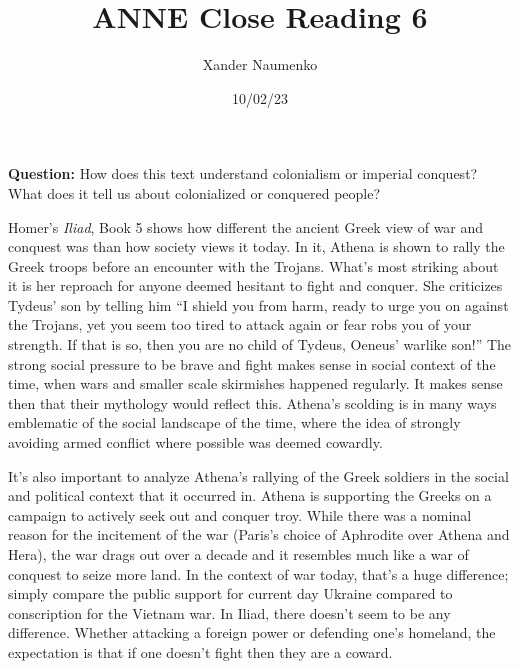 \documentclass[letterpaper, reqno,11pt]{article}
\begin{document}
\title{ANNE Close Reading 6}
\date{10/02/23}
\author{Xander Naumenko}
\maketitle

{\bf Question:} How does this text understand colonialism or imperial conquest? What does it tell us about colonialized or conquered people? 

Homer's {\em Iliad}, Book 5 shows how different the ancient Greek view of war and conquest was than how society views it today. In it, Athena is shown to rally the Greek troops before an encounter with the Trojans. What's most striking about it is her reproach for anyone deemed hesitant to fight and conquer. She criticizes Tydeus' son by telling him ``I shield you from harm, ready to urge you on against the Trojans, yet you seem too tired to attack again or fear robs you of your strength. If that is so, then you are no child of Tydeus, Oeneus' warlike son!'' The strong social pressure to be brave and fight makes sense in social context of the time, when wars and smaller scale skirmishes happened regularly. It makes sense then that their mythology would reflect this. Athena's scolding is in many ways emblematic of the social landscape of the time, where the idea of strongly avoiding armed conflict where possible was deemed cowardly. 

It's also important to analyze Athena's rallying of the Greek soldiers in the social and political context that it occurred in. Athena is supporting the Greeks on a campaign to actively seek out and conquer troy. While there was a nominal reason for the incitement of the war (Paris's choice of Aphrodite over Athena and Hera), the war drags out over a decade and it resembles much like a war of conquest to seize more land. In the context of war today, that's a huge difference; simply compare the public support for current day Ukraine compared to conscription for the Vietnam war. In Iliad, there doesn't seem to be any difference. Whether attacking a foreign power or defending one's homeland, the expectation is that if one doesn't fight then they are a coward. 
\end{document}
